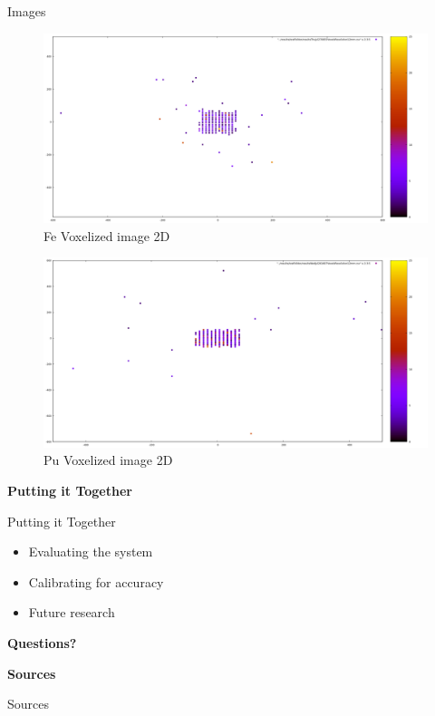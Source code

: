 \documentclass[14pt, aspectratio=169]{beamer}
\begin{document}
\begin{frame}{Images}
   \begin{figure}
        \includegraphics[width=\textwidth]{images/12mm res iron.png}
            \caption{Fe Voxelized image 2D}
    \end{figure}
    
\end{frame}
\begin{frame}
    \begin{figure}
        \includegraphics[width=\textwidth]{images/12mm res plutonium.png}
            \caption{Pu Voxelized image 2D}
    \end{figure}
\end{frame}

\begin{frame}{}
    \large \textbf{Putting it Together}
\end{frame}

\begin{frame}{Putting it Together}
    \begin{itemize}
        \item<1-> Evaluating the system
        \item<2-> Calibrating for accuracy
        \item<3-> Future research
    \end{itemize}

\end{frame}


\begin{frame}{}
    \large \textbf{Questions?}
\end{frame}


\begin{frame}{}
    \large \textbf{Sources}
\end{frame}
\begin{frame}[allowframebreaks]{Sources}
    
    
\end{frame}
\end{document}

